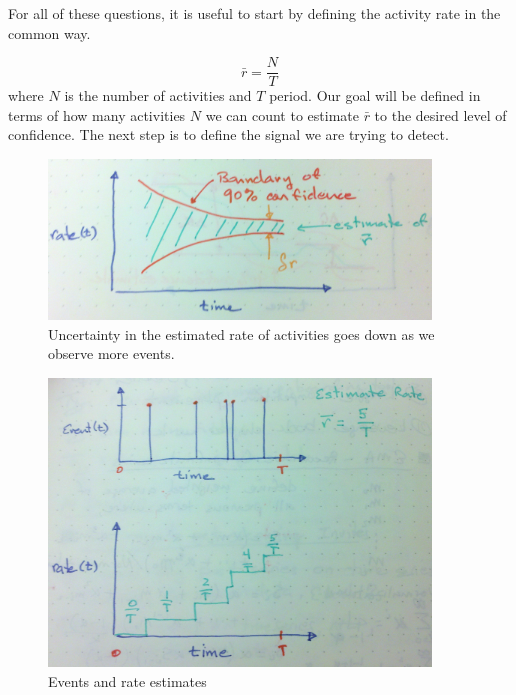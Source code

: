 \documentclass{article}
\begin{document}
For all of these questions, it is useful to start by defining the activity rate in the common way.

\begin{equation}
    \label{eq:rateEst}
    \bar{r} = \frac{N}{T}
\end{equation}
where $N$ is the number of activities and $T$ period.  Our goal will be defined in terms of how many activities $N$ we can count to estimate $\bar{r}$ to the desired level of confidence. The next step is to define the signal we are trying to detect.



%
\begin{figure}[h]
	\begin{center}
		\includegraphics[width=4.0in]{./imgs/confidence.jpg}
	\end{center}
	\caption{Uncertainty in the estimated rate of activities goes down as we observe more events. }
    	\label{fig:confidence}
\end{figure}
%
%


%
\begin{figure}[h]
    \centering
    \includegraphics[width=4.0in]{./imgs/events.jpg}
    \caption{Events and rate estimates}
    \label{fig:events}
\end{figure}
%
%
\end{document}
